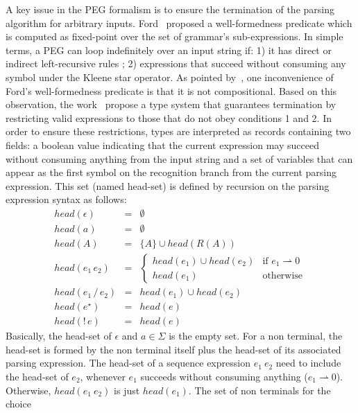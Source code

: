 \documentclass[preprint,12pt]{elsarticle}
\theoremstyle{definition}
\begin{document}
A key issue in the PEG formalism is to ensure the termination of the parsing algorithm
for arbitrary inputs. Ford~\cite{Ford2004} proposed a well-formedness predicate
which is computed as fixed-point over the set of grammar's sub-expressions.
In simple terms, a PEG can loop indefinitely over an input string if: 1) it has
direct or indirect left-recursive rules ; 2) expressions that succeed without
consuming any symbol under the Kleene star operator.
As pointed by~\cite{Ribeiro19}, one inconvenience of Ford's well-formedness predicate
is that it is not compositional.
Based on this observation, the work~\cite{Ribeiro19} propose a type
system that guarantees termination by restricting valid expressions to those
that do not obey conditions 1 and 2. In order to ensure these restrictions,
types are interpreted as records containing two fields:
a boolean value indicating that the current expression may succeed without
consuming anything from the input string and a set of variables that can
appear as the first symbol on the recognition branch from the current parsing
expression. This set (named head-set) is defined by recursion on the parsing
expression syntax as follows:
\[
  \begin{array}{lcl}
    head (\epsilon) & = & \emptyset \\
    head (a) & = & \emptyset \\
    head (A) & = & \{A\} \cup head(R(A)) \\
    head (e_1\,e_2) & = & \left\{
                          \begin{array}{ll}
                            head(e_1) \cup head(e_2) & \text{if }e_1 \rightharpoonup 0\\
                            head(e_1) & \text{otherwise}
                          \end{array}
                                        \right. \\
    head(e_1\,/\,e_2) & = & head(e_1) \cup head(e_2) \\
    head(e^\star) & = & head(e) \\
    head(!\,e)    & = & head(e)
  \end{array}
\]
Basically, the head-set of $\epsilon$ and $a \in \Sigma$ is the empty set.
For a non terminal, the head-set is formed by the non terminal itself plus
the head-set of its associated parsing expression. The head-set of a sequence
expression $e_1\:e_2$ need to include the head-set of $e_2$, whenever $e_1$
succeeds without consuming anything ($e_1 \rightharpoonup 0$). Otherwise,
$head(e_1\:e_2)$ is just $head(e_1)$. The set of non terminals for the choice
\end{document}
